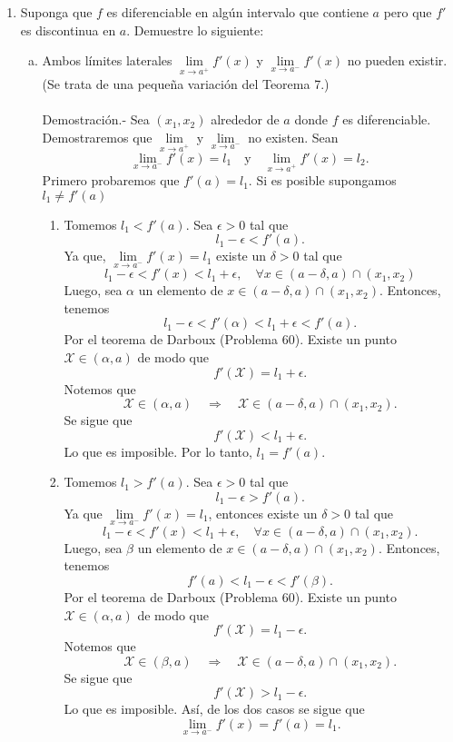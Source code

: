 \begin{enumerate}[\bfseries 1.]
\begin{enumerate}[(a)]
	\end{enumerate}

    \item Suponga que $f$ es diferenciable en algún intervalo que contiene $a$ pero que $f'$ es discontinua en $a$. Demuestre lo siguiente:

	\begin{enumerate}[(a)]

	    \item Ambos límites laterales $\lim\limits_{x\to a^+}f'(x)$ y $\lim\limits_{x\to a^-} f'(x)$ no pueden existir. (Se trata de una pequeña variación del Teorema 7.)\\\\
		Demostración.-\; Sea $(x_1,x_2)$ alrededor de $a$ donde $f$ es diferenciable. Demostraremos que $\lim\limits_{x\to a^+}$ y $\lim\limits_{x\to a^-}$ no existen. Sean
		$$\lim_{x\to a^-}f'(x)=l_1\quad \mbox{y}\quad \lim_{x\to a^+}f'(x)=l_2.$$
		Primero probaremos que $f'(a)=l_1$. Si es posible supongamos $l_1\neq f'(a)$

		\begin{enumerate}
		    \item Tomemos $l_1<f'(a)$. Sea $\epsilon>0$ tal que
		    $$l_1-\epsilon<f'(a).$$
		    Ya que, $\lim\limits_{x\to a^-}f'(x)=l_1$ existe un $\delta>0$ tal que
		    $$l_1-\epsilon<f'(x)<l_1+\epsilon,\quad \forall x\in (a-\delta,a)\cap(x_1,x_2)$$
		    Luego, sea $\alpha$ un elemento de $x\in (a-\delta,a)\cap(x_1,x_2)$. Entonces, tenemos
		    $$l_1-\epsilon<f'(\alpha)<l_1+\epsilon<f'(a).$$
		    Por el teorema de Darboux (Problema 60). Existe un punto $\mathcal{X}\in (\alpha,a)$ de modo que
		    $$f'\left(\mathcal{X}\right)=l_1+\epsilon.$$
		    Notemos que
		    $$\mathcal{X}\in \left(\alpha,a\right)\quad\Rightarrow \quad \mathcal{X}\in (a-\delta,a)\cap (x_1,x_2).$$
		    Se sigue que
		    $$f'\left(\mathcal{X}\right)<l_1+\epsilon.$$
		    Lo que es imposible. Por lo tanto, $l_1=f'(a)$.\\

		    \item Tomemos $l_1>f'(a)$. Sea $\epsilon>0$ tal que
		    $$l_1-\epsilon>f'(a).$$
		    Ya que $\lim\limits_{x\to a^-}f'(x)=l_1$, entonces existe un $\delta>0$ tal que
		    $$l_1-\epsilon<f'(x)<l_1+\epsilon,\quad \forall x\in (a-\delta,a)\cap(x_1,x_2).$$
		    Luego, sea $\beta$ un elemento de $x\in (a-\delta,a)\cap(x_1,x_2)$. Entonces, tenemos
		    $$f'(a)<l_1-\epsilon<f'(\beta).$$
		    Por el teorema de Darboux (Problema 60). Existe un punto $\mathcal{X}\in (\alpha,a)$ de modo que
		    $$f'\left(\mathcal{X}\right)=l_1-\epsilon.$$
		    Notemos que
		    $$\mathcal{X}\in \left(\beta,a\right)\quad\Rightarrow \quad \mathcal{X}\in (a-\delta,a)\cap (x_1,x_2).$$
		    Se sigue que
		    $$f'\left(\mathcal{X}\right)>l_1-\epsilon.$$
		    Lo que es imposible. Así, de los dos casos se sigue que
		    $$\lim_{x\to a^-}f'(x)=f'(a)=l_1.$$\\


\end{enumerate}
\end{enumerate}
\end{enumerate}
